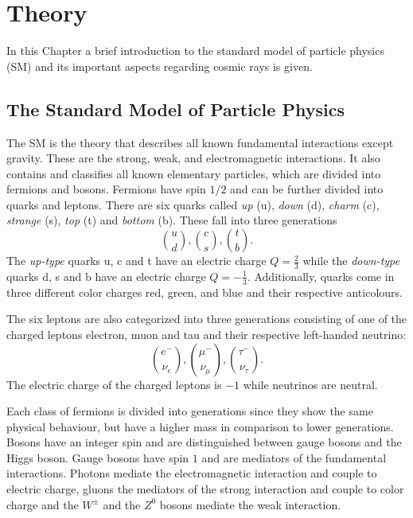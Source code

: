 \section{Theory}\label{sec:Theory}
In this Chapter a brief introduction to the standard model of particle physics (SM) and its important aspects regarding cosmic rays is given.

\subsection{The Standard Model of Particle Physics}
The SM \cite{griffiths} is the theory that describes all known fundamental interactions except gravity. These are the strong, weak, and electromagnetic interactions. It also contains and classifies all known elementary particles, which are divided into fermions and bosons.
Fermions have spin $1/2$ and can be further divided into quarks and leptons.
There are six quarks called \textit{up} (u), \textit{down} (d), \textit{charm} (c), \textit{strange} (s), \textit{top} (t) and \textit{bottom} (b).
These fall into three generations
\begin{equation*}
  \binom{u}{d},\binom{c}{s},\binom{t}{b}.
\end{equation*}
The \textit{up-type} quarks u, c and t have an electric charge $Q = \frac{2}{3}$ while the \textit{down-type} quarks d, s and b have an electric charge $Q = - \frac{1}{3}$.
Additionally, quarks come in three different color charges red, green, and blue and their respective anticolours.

The six leptons are also categorized into three generations consisting of one of the charged leptons electron, muon and tau and their respective left-handed neutrino:
\begin{equation*}
  \binom{e^-}{\nu_e},\binom{\mu^-}{\nu_\mu},\binom{\tau^-}{\nu_\tau}.
\end{equation*}
The electric charge of the charged leptons is $\num{-1}$ while neutrinos are neutral.

Each class of fermions is divided into generations since they show the same physical behaviour, but have a higher mass in comparison to lower generations.\\

Bosons have an integer spin and are distinguished between gauge bosons and the Higgs boson.
Gauge bosons have spin $1$ and are mediators of the fundamental interactions. Photons mediate the electromagnetic interaction and couple to electric charge, gluons the mediators of the strong interaction and couple to color charge and the $W^{\pm}$ and the $Z^0$ bosons mediate the weak interaction.

